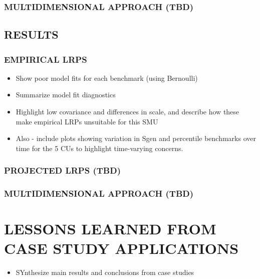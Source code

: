 \documentclass[11pt]{book}
\begin{document}
\hypertarget{multidimensional-approach-tbd}{%
\subsubsection{MULTIDIMENSIONAL APPROACH (TBD)}\label{multidimensional-approach-tbd}}

\hypertarget{results-2}{%
\subsection{RESULTS}\label{results-2}}

\hypertarget{empirical-lrps-3}{%
\subsubsection{EMPIRICAL LRPS}\label{empirical-lrps-3}}
\begin{itemize}

\item
  Show poor model fits for each benchmark (using Bernoulli)
\item
  Summarize model fit diagnostics
\item
  Highlight low covariance and differences in scale, and describe how these make empirical LRPs unsuitable for this SMU
\item
  Also - include plots showing variation in Sgen and percentile benchmarks over time for the 5 CUs to highlight time-varying concerns.
\end{itemize}
\hypertarget{projected-lrps-tbd-1}{%
\subsubsection{PROJECTED LRPS (TBD)}\label{projected-lrps-tbd-1}}

\hypertarget{multidimensional-approach-tbd-1}{%
\subsubsection{MULTIDIMENSIONAL APPROACH (TBD)}\label{multidimensional-approach-tbd-1}}

\hypertarget{lessons-learned-from-case-study-applications}{%
\section{LESSONS LEARNED FROM CASE STUDY APPLICATIONS}\label{lessons-learned-from-case-study-applications}}
\begin{itemize}

\item
  SYnthesize main results and conclusions from case studies
\end{itemize}
\clearpage
\end{document}
